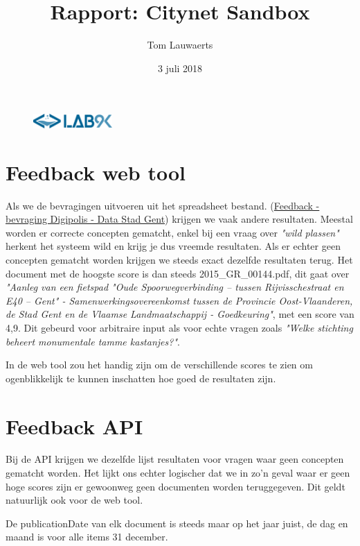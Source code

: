\documentclass[11pt, letterpaper, oneside]{article}
\title{Rapport: Citynet Sandbox}
\author{Tom Lauwaerts}
\date{3 juli 2018}
\begin{document}
	\begin{figure}
			\includegraphics[width=0.27\textwidth,keepaspectratio,right]{figuren/logo} %
	\end{figure}
	\vspace*{0.75cm}
	
	\noindent
	\fontsize{30pt}{18pt}\selectfont\textcolor{priColour}{\textbf{\@title}}\newline
	
	\fontsize{11pt}{15pt}\selectfont
	\section{Feedback web tool}
	Als we de bevragingen uitvoeren uit het spreadsheet bestand. (\href{https://docs.google.com/spreadsheets/d/1eH3B7dC7MSjM5RJHtsiqMeepdzvHi-di5VJLD1ZBV-s/edit#gid=967764322}{Feedback - bevraging Digipolis - Data Stad Gent}) krijgen we vaak andere resultaten. Meestal worden er correcte concepten gematcht, enkel bij een vraag over \textit{"wild plassen"} herkent het systeem wild en krijg je dus vreemde resultaten. Als er echter geen concepten gematcht worden krijgen we steeds exact dezelfde resultaten terug. Het document met de hoogste score is dan steeds 2015\_GR\_00144.pdf, dit gaat over \textit{"Aanleg van een fietspad "Oude Spoorwegverbinding – tussen Rijvisschestraat en E40 – Gent" - Samenwerkingsovereenkomst tussen de Provincie Oost-Vlaanderen, de Stad Gent en de Vlaamse Landmaatschappij - Goedkeuring"}, met een score van 4,9. Dit gebeurd voor arbitraire input als voor echte vragen zoals \textit{"Welke stichting beheert monumentale tamme kastanjes?"}.
	
	In de web tool zou het handig zijn om de verschillende scores te zien om ogenblikkelijk te kunnen inschatten hoe goed de resultaten zijn.
	\section{Feedback API}
	Bij de API krijgen we dezelfde lijst resultaten voor vragen waar geen concepten gematcht worden. Het lijkt ons echter logischer dat we in zo'n geval waar er geen hoge scores zijn er gewoonweg geen documenten worden teruggegeven. Dit geldt natuurlijk ook voor de web tool.
	
	De publicationDate van elk document is steeds maar op het jaar juist, de dag en maand is voor alle items 31 december.
\end{document}
